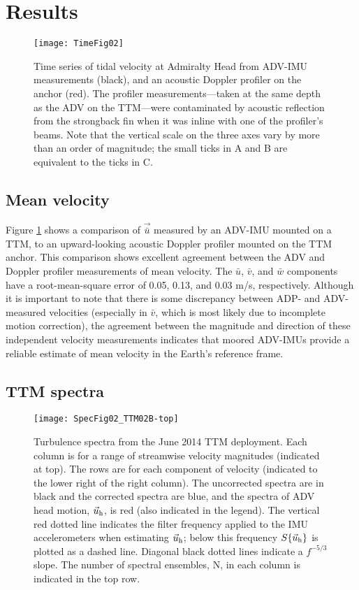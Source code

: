 \section{Results}
\label{sec:results}

\begin{figure}[t]
  \centering
  \texttt{[image: TimeFig02]}
  \caption{Time series of tidal velocity at Admiralty Head from ADV-IMU measurements (black), and an acoustic Doppler profiler on the anchor (red). The profiler measurements---taken at the same depth as the ADV on the TTM---were contaminated by acoustic reflection from the strongback fin when it was inline with one of the profiler's beams. Note that the vertical scale on the three axes vary by more than an order of magnitude; the small ticks in A and B are equivalent to the ticks in C.}
  \label{fig:vel_time}
\end{figure}

\subsection{Mean velocity}

Figure \ref{fig:vel_time} shows a comparison of $\vec{\bar u}$ measured by an ADV-IMU mounted on a TTM, to an upward-looking acoustic Doppler profiler mounted on the TTM anchor. This comparison shows excellent agreement between the ADV and Doppler profiler measurements of mean velocity. The $\bar u$, $\bar v$, and $\bar w$ components have a root-mean-square error of 0.05, 0.13, and 0.03 m/s, respectively. Although it is important to note that there is some discrepancy between ADP- and ADV-measured velocities (especially in $\bar v$, which is most likely due to incomplete motion correction), the agreement between the magnitude and direction of these independent velocity measurements indicates that moored ADV-IMUs provide a reliable estimate of mean velocity in the Earth's reference frame.

\subsection{TTM spectra}

\begin{figure*}[t]
  \centering
  \texttt{[image: SpecFig02\_TTM02B-top]}
  \caption{Turbulence spectra from the June 2014 TTM deployment. Each column is for a range of streamwise velocity magnitudes (indicated at top). The rows are for each component of velocity (indicated to the lower right of the right column). The uncorrected spectra are in black and the corrected spectra are blue, and the spectra of ADV head motion, $\vec{u}_\mathrm{h}$, is red (also indicated in the legend). The vertical red dotted line indicates the filter frequency applied to the IMU accelerometers when estimating $\vec{u}_\mathrm{h}$; below this frequency $S\{\vec{u}_\mathrm{h}\}$ is plotted as a dashed line.   Diagonal black dotted lines indicate a $f^{-5/3}$ slope. The number of spectral ensembles, N, in each column is indicated in the top row.}
  \label{fig:spec:ttm}
\end{figure*}

